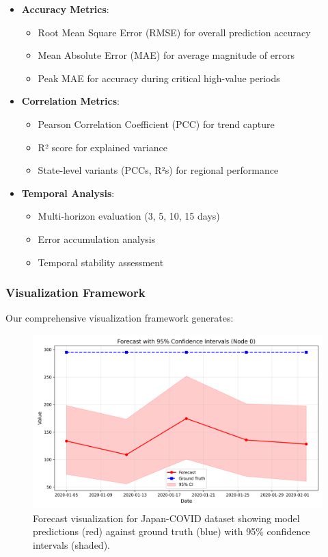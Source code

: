 \documentclass[lettersize, journal]{IEEEtran}
\begin{document}
\begin{itemize}
    \item \textbf{Accuracy Metrics}:
    \begin{itemize}
        \item Root Mean Square Error (RMSE) for overall prediction accuracy
        \item Mean Absolute Error (MAE) for average magnitude of errors
        \item Peak MAE for accuracy during critical high-value periods
    \end{itemize}
    
    \item \textbf{Correlation Metrics}:
    \begin{itemize}
        \item Pearson Correlation Coefficient (PCC) for trend capture
        \item R² score for explained variance
        \item State-level variants (PCCs, R²s) for regional performance
    \end{itemize}
    
    \item \textbf{Temporal Analysis}:
    \begin{itemize}
        \item Multi-horizon evaluation (3, 5, 10, 15 days)
        \item Error accumulation analysis
        \item Temporal stability assessment
    \end{itemize}
\end{itemize}

\subsubsection{Visualization Framework}
Our comprehensive visualization framework generates:

\begin{figure}[h]
    \centering
    \includegraphics[width=\columnwidth]{../figures/forecast_japan.w-20.h-5.png}
    \caption{Forecast visualization for Japan-COVID dataset showing model predictions (red) against ground truth (blue) with 95\% confidence intervals (shaded).}
    \label{fig:forecast_japan}
\end{figure}
\end{document}
